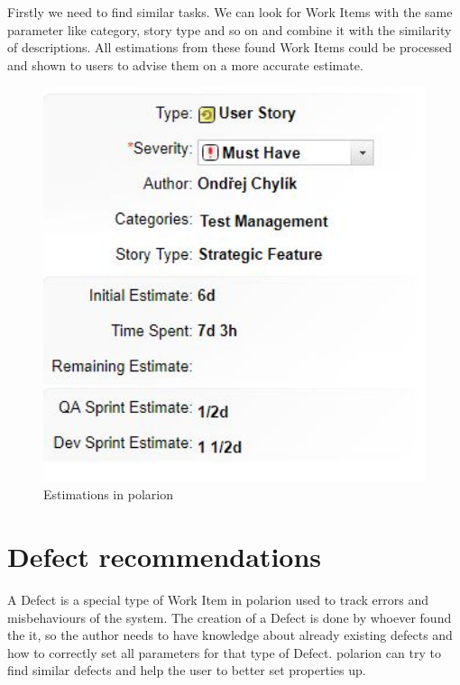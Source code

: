\documentclass[thesis=M,english]{FITthesis}[2012/06/26]
\begin{document}
Firstly we need to find similar tasks. We can look for Work Items with the same parameter like category, story type and so on and combine it with the similarity of descriptions. All estimations from these found Work Items could be processed and shown to users to advise them on a more accurate estimate.

\begin{figure}[h!]\centering
	\includegraphics[width=1\textwidth]{pictures/polarion_estimation}
	\caption{Estimations in \acrshort{polarion}}\label{fig:polarion_estimation}
\end{figure}

\section{Defect recommendations} \label{sec:defect_recommendations}

A Defect is a special type of Work Item in \acrshort{polarion} used to track errors and misbehaviours of the system. The creation of a Defect is done by whoever found the it, so the author needs to have knowledge about already existing defects and how to correctly set all parameters for that type of Defect. \acrshort{polarion} can try to find similar defects and help the user to better set properties up.\\
\end{document}
